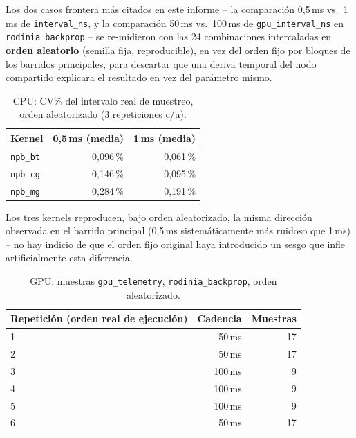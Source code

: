 Los dos casos frontera más citados en este informe -- la comparación
0{,}5\,ms vs.\ 1\,ms de \texttt{interval\_ns}, y la comparación 50\,ms vs.\
100\,ms de \texttt{gpu\_interval\_ns} en \texttt{rodinia\_backprop} -- se
re-midieron con las 24 combinaciones intercaladas en \textbf{orden
aleatorio} (semilla fija, reproducible), en vez del orden fijo por bloques
de los barridos principales, para descartar que una deriva temporal del
nodo compartido explicara el resultado en vez del parámetro mismo.

\begin{table}[H]
\centering
\caption{CPU: CV\% del intervalo real de muestreo, orden aleatorizado (3 repeticiones c/u).}
\label{tab:randomized-cpu}
\small
\begin{tabular}{@{}lrr@{}}
\toprule
\textbf{Kernel} & \textbf{0{,}5\,ms (media)} & \textbf{1\,ms (media)} \\
\midrule
\texttt{npb\_bt} & 0{,}096\,\% & 0{,}061\,\% \\
\texttt{npb\_cg} & 0{,}146\,\% & 0{,}095\,\% \\
\texttt{npb\_mg} & 0{,}284\,\% & 0{,}191\,\% \\
\bottomrule
\end{tabular}
\end{table}

Los tres kernels reproducen, bajo orden aleatorizado, la misma dirección
observada en el barrido principal (0{,}5\,ms sistemáticamente más ruidoso
que 1\,ms) -- no hay indicio de que el orden fijo original haya introducido
un sesgo que infle artificialmente esta diferencia.

\begin{table}[H]
\centering
\caption{GPU: muestras \texttt{gpu\_telemetry}, \texttt{rodinia\_backprop}, orden aleatorizado.}
\label{tab:randomized-gpu}
\small
\begin{tabular}{@{}lrr@{}}
\toprule
\textbf{Repetición (orden real de ejecución)} & \textbf{Cadencia} & \textbf{Muestras} \\
\midrule
1 & 50\,ms  & 17 \\
2 & 50\,ms  & 17 \\
3 & 100\,ms & 9 \\
4 & 100\,ms & 9 \\
5 & 100\,ms & 9 \\
6 & 50\,ms  & 17 \\
\bottomrule
\end{tabular}
\end{table}

